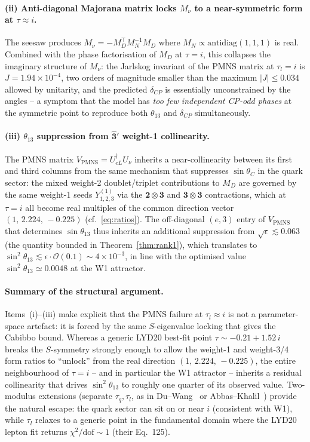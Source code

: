 \documentclass[a4paper,11pt]{article}
\begin{document}
\paragraph{(ii) Anti-diagonal Majorana matrix locks $M_\nu$ to a
near-symmetric form at $\tau\approx i$.}
The seesaw produces
$M_\nu = -M_D^\top M_N^{-1} M_D$ where $M_N \propto \mathrm{antidiag}(1,1,1)$
is real.  Combined with the phase factorisation of $M_D$ at $\tau=i$,
this collapses the imaginary structure of $M_\nu$: the Jarlskog
invariant of the PMNS matrix at $\tau_l=i$ is $J=1.94\times 10^{-4}$,
two orders of magnitude smaller than the maximum $|J|\le 0.034$
allowed by unitarity, and the predicted $\delta_{CP}$ is essentially
unconstrained by the angles -- a symptom that the model has
\emph{too few independent CP-odd phases} at the symmetric point to
reproduce both $\theta_{13}$ and $\delta_{CP}$ simultaneously.

\paragraph{(iii) $\theta_{13}$ suppression from $\hat{\mathbf{3}}'$
weight-1 collinearity.}
The PMNS matrix $V_{\mathrm{PMNS}}=U_{eL}^\dagger U_\nu$ inherits a
near-collinearity between its first and third columns from the same
mechanism that suppresses $\sin\theta_C$ in the quark sector: the
mixed weight-2 doublet/triplet contributions to $M_D$ are governed by
the same weight-1 seeds $Y_{1,2,3}^{(1)}$ via the
$\mathbf{2}\otimes\mathbf{3}$ and $\mathbf{3}\otimes\mathbf{3}$
contractions, which at $\tau=i$ all become real multiples of the
common direction vector $(1,\,2.224,\,-0.225)$ (cf.~\eqref{eq:ratios}).
The off-diagonal $(e,3)$ entry of $V_{\mathrm{PMNS}}$ that determines
$\sin\theta_{13}$ thus inherits an additional suppression from
$\sqrt{\epsilon}\lesssim 0.063$ (the quantity bounded in
Theorem~\ref{thm:rank1}), which translates to
$\sin^2\theta_{13}\lesssim \epsilon \cdot \mathcal{O}(0.1)
\sim 4\times 10^{-3}$, in line with the optimised value
$\sin^2\theta_{13} \simeq 0.0048$ at the W1 attractor.

\paragraph{Summary of the structural argument.}
Items~(i)--(iii) make explicit that the PMNS failure at
$\tau_l\approx i$ is not a parameter-space artefact: it is forced by
the same $S$-eigenvalue locking that gives the Cabibbo bound.
Whereas a generic LYD20 best-fit point $\tau\sim -0.21 + 1.52\,i$
breaks the $S$-symmetry strongly enough to allow the weight-1 and
weight-3/4 form ratios to ``unlock'' from the real direction
$(1,\,2.224,\,-0.225)$, the entire neighbourhood of $\tau=i$ -- and in
particular the W1 attractor -- inherits a residual collinearity that
drives $\sin^2\theta_{13}$ to roughly one quarter of its observed
value.  Two-modulus extensions (separate $\tau_q,\tau_l$, as in
Du--Wang~\cite{DuWang22} or Abbas--Khalil~\cite{AbbasKhalil22})
provide the natural escape: the quark sector can sit on or near $i$
(consistent with W1), while $\tau_l$ relaxes to a generic point in the
fundamental domain where the LYD20 lepton fit returns
$\chi^2/\mathrm{dof}\sim 1$ (their Eq.~125).
\end{document}
